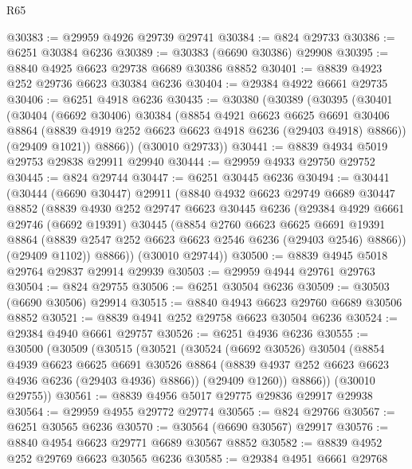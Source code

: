 \begin{lexlean}{R65}
\begin{coremodule}
{@30383 := @29959 @4926 @29739 @29741
@30384 := @824 @29733
@30386 := @6251 @30384 @6236
@30389 := @30383 (@6690 @30386) @29908
@30395 := @8840 @4925 @6623 @29738 @6689 @30386 @8852
@30401 := @8839 @4923 @252 @29736 @6623 @30384 @6236
@30404 := @29384 @4922 @6661 @29735
@30406 := @6251 @4918 @6236
@30435 := @30380
    (@30389
      (@30395
        (@30401
          (@30404
            (@6692 @30406)
            @30384
            (@8854
              @4921
              @6623
              @6625
              @6691
              @30406
              @8864
              (@8839 @4919 @252 @6623 @6623 @4918 @6236 (@29403 @4918) @8866))
            (@29409 @1021))
          @8866))
      (@30010 @29733))
@30441 := @8839 @4934 @5019 @29753 @29838 @29911 @29940
@30444 := @29959 @4933 @29750 @29752
@30445 := @824 @29744
@30447 := @6251 @30445 @6236
@30494 := @30441
    (@30444
      (@6690 @30447)
      @29911
      (@8840
        @4932
        @6623
        @29749
        @6689
        @30447
        @8852
        (@8839
          @4930
          @252
          @29747
          @6623
          @30445
          @6236
          (@29384
            @4929
            @6661
            @29746
            (@6692 @19391)
            @30445
            (@8854
              @2760
              @6623
              @6625
              @6691
              @19391
              @8864
              (@8839 @2547 @252 @6623 @6623 @2546 @6236 (@29403 @2546) @8866))
            (@29409 @1102))
          @8866))
      (@30010 @29744))
@30500 := @8839 @4945 @5018 @29764 @29837 @29914 @29939
@30503 := @29959 @4944 @29761 @29763
@30504 := @824 @29755
@30506 := @6251 @30504 @6236
@30509 := @30503 (@6690 @30506) @29914
@30515 := @8840 @4943 @6623 @29760 @6689 @30506 @8852
@30521 := @8839 @4941 @252 @29758 @6623 @30504 @6236
@30524 := @29384 @4940 @6661 @29757
@30526 := @6251 @4936 @6236
@30555 := @30500
    (@30509
      (@30515
        (@30521
          (@30524
            (@6692 @30526)
            @30504
            (@8854
              @4939
              @6623
              @6625
              @6691
              @30526
              @8864
              (@8839 @4937 @252 @6623 @6623 @4936 @6236 (@29403 @4936) @8866))
            (@29409 @1260))
          @8866))
      (@30010 @29755))
@30561 := @8839 @4956 @5017 @29775 @29836 @29917 @29938
@30564 := @29959 @4955 @29772 @29774
@30565 := @824 @29766
@30567 := @6251 @30565 @6236
@30570 := @30564 (@6690 @30567) @29917
@30576 := @8840 @4954 @6623 @29771 @6689 @30567 @8852
@30582 := @8839 @4952 @252 @29769 @6623 @30565 @6236
@30585 := @29384 @4951 @6661 @29768
}
\end{coremodule}
\end{lexlean}
